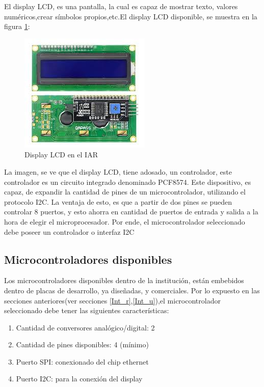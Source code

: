 El display LCD, es una pantalla, la cual es capaz de mostrar texto, valores numéricos,crear símbolos propios,etc.El display LCD disponible, se muestra en la figura \ref{fig:LCD_r}: 
\begin{figure}[ht]
	\centering
	\includegraphics{dispLCD} 
	\caption{Display LCD en el IAR}
	\label{fig:LCD_r}
\end{figure}

La imagen, se ve que el display LCD, tiene adosado, un controlador, este controlador es un circuito integrado denominado PCF8574. Este dispositivo, es capaz, de expandir la cantidad de pines de un microcontrolador, utilizando el protocolo I2C. La ventaja de esto, es que a partir de dos pines se pueden controlar 8 puertos, y esto ahorra en cantidad de puertos de entrada y salida a la hora de elegir el microprocesador. Por ende, el microcontrolador seleccionado debe poseer un controlador o interfaz I2C   



\subsection{Microcontroladores disponibles}  

Los microcontroladores disponibles dentro de la institución, están embebidos dentro de placas de desarrollo, ya diseñadas, y comerciales. Por lo expuesto en las secciones anteriores(ver secciones \ref{Int_r},\ref{Int_u}),el microcontrolador seleccionado debe tener las siguientes características:

\begin{enumerate}
	\item Cantidad de conversores analógico/digital: 2
	\item Cantidad de pines disponibles: 4 (mínimo) 
	\item Puerto SPI: conexionado del chip ethernet
	\item Puerto I2C: para la conexión del display 
\end{enumerate}

